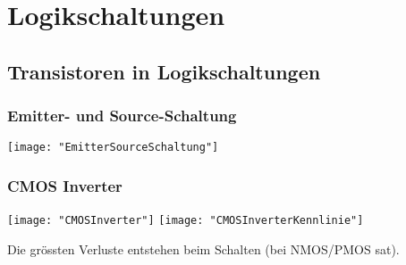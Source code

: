 \section{Logikschaltungen}
\subsection{Transistoren in Logikschaltungen}
\subsubsection{Emitter- und Source-Schaltung}
\begin{minipage}[t]{0.3\textwidth}
	\vspace{0pt}								%
	\texttt{[image: "EmitterSourceSchaltung"]}
\end{minipage}\hspace{0.05\textwidth}
\begin{minipage}[t]{0.65\textwidth}
	\vspace{0pt}								%
	
\end{minipage}
\vspace{2mm}


\subsubsection{CMOS Inverter}
\begin{minipage}[t]{0.3\textwidth}
	\vspace{0pt}								%
	\texttt{[image: "CMOSInverter"]}
	\texttt{[image: "CMOSInverterKennlinie"]}
\end{minipage}\hspace{0.05\textwidth}
\begin{minipage}[t]{0.65\textwidth}
	\vspace{0pt}								%
	Die grössten Verluste entstehen beim Schalten (bei NMOS/PMOS sat).
\end{minipage}
\vspace{2mm}


